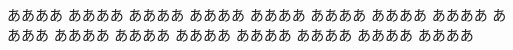 \documentclass[preview]{standalone}
\begin{document}
ああああ
ああああ
ああああ
ああああ
ああああ
ああああ
ああああ
ああああ
ああああ
ああああ
ああああ
ああああ
ああああ
ああああ
ああああ
ああああ
\end{document}
